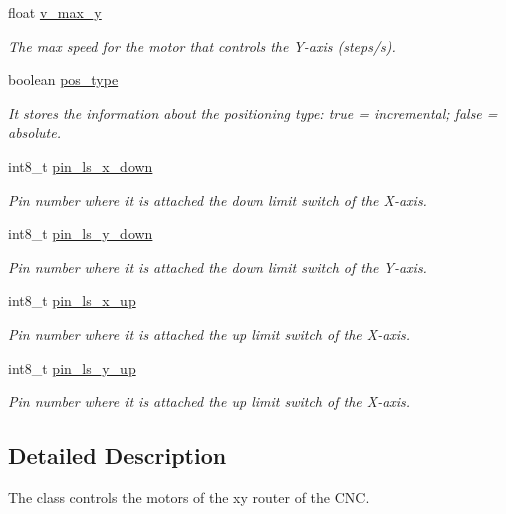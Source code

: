 \begin{DoxyCompactItemize}
float \hyperlink{class_c_n_c___router_a5e3fe2fd85292f3f5d9d2e13078b6a42}{v\+\_\+max\+\_\+y}
\begin{DoxyCompactList}\small\item\em The max speed for the motor that controls the Y-\/axis (steps/s). \end{DoxyCompactList}\item 
boolean \hyperlink{class_c_n_c___router_afd35356064c7667cbdf21c44a7dd7cf5}{pos\+\_\+type}
\begin{DoxyCompactList}\small\item\em It stores the information about the positioning type\+: true = incremental; false = absolute. \end{DoxyCompactList}\item 
int8\+\_\+t \hyperlink{class_c_n_c___router_a109a7c6e2a1e556e577f2ad09eefbef7}{pin\+\_\+ls\+\_\+x\+\_\+down}
\begin{DoxyCompactList}\small\item\em Pin number where it is attached the down limit switch of the X-\/axis. \end{DoxyCompactList}\item 
int8\+\_\+t \hyperlink{class_c_n_c___router_a19cd8e9840fbfab991f9cab1300abe04}{pin\+\_\+ls\+\_\+y\+\_\+down}
\begin{DoxyCompactList}\small\item\em Pin number where it is attached the down limit switch of the Y-\/axis. \end{DoxyCompactList}\item 
int8\+\_\+t \hyperlink{class_c_n_c___router_af935b225740dd189dcdcdca7664eb850}{pin\+\_\+ls\+\_\+x\+\_\+up}
\begin{DoxyCompactList}\small\item\em Pin number where it is attached the up limit switch of the X-\/axis. \end{DoxyCompactList}\item 
int8\+\_\+t \hyperlink{class_c_n_c___router_a056de16bac1a523455a7be2903e44f40}{pin\+\_\+ls\+\_\+y\+\_\+up}
\begin{DoxyCompactList}\small\item\em Pin number where it is attached the up limit switch of the X-\/axis. \end{DoxyCompactList}\end{DoxyCompactItemize}


\subsection{Detailed Description}
The class controls the motors of the xy router of the C\+N\+C. 

